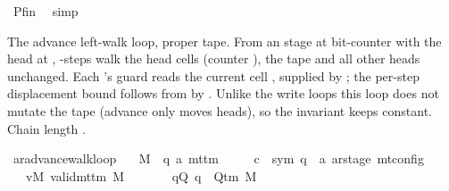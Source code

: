 \begin{isabellebody}
\ Pfin\ \isamarkupfalse%
\ simp\isanewline
\ \ \isamarkupfalse%
\isanewline
{}\isamarkupfalse%
%
\endisatagproof
{\isafoldproof}%
%
\isadelimproof
%
\endisadelimproof
%
\begin{isamarkuptext}%
The advance left-walk loop, proper tape.  From an
   stage at bit-counter  with the head
  at ,  -steps walk the head
   cells  (counter ), the tape
  and all other heads unchanged.  Each 's
   guard reads the current cell
  , supplied  by ;
  the per-step displacement bound  follows from
   by .  Unlike the write loops this loop
  does not mutate the tape (advance only moves heads), so the invariant
  keeps  constant.  Chain length
  .%
\end{isamarkuptext}\isamarkuptrue%
\isamarkupfalse%
\ ar{\isacharunderscore}{\kern0pt}advance{\isacharunderscore}{\kern0pt}walk{\isacharunderscore}{\kern0pt}loop{\isacharcolon}{\kern0pt}\isanewline
\ \ \ M\ {\isacharcolon}{\kern0pt}{\isacharcolon}{\kern0pt}\ {\isachardoublequoteopen}{\isacharparenleft}{\kern0pt}{\isacharprime}{\kern0pt}q{\isacharcomma}{\kern0pt}\ {\isacharprime}{\kern0pt}a{\isacharparenright}{\kern0pt}\ mttm{\isachardoublequoteclose}\isanewline
\ \ \ \ \ c{}\ {\isacharcolon}{\kern0pt}{\isacharcolon}{\kern0pt}\ {\isachardoublequoteopen}{\isacharparenleft}{\kern0pt}sym{}{\isacharcomma}{\kern0pt}\ {\isacharprime}{\kern0pt}q\ {\isasymtimes}\ {\isacharprime}{\kern0pt}a\ ar{\isacharunderscore}{\kern0pt}stage{\isacharparenright}{\kern0pt}\ mt{\isacharunderscore}{\kern0pt}config{\isachardoublequoteclose}\isanewline
\ \ \ vM{\isacharcolon}{\kern0pt}\ {\isachardoublequoteopen}valid{\isacharunderscore}{\kern0pt}mttm\ M{\isachardoublequoteclose}\isanewline
\ \ \ \ \ \ \ qQ{\isacharcolon}{\kern0pt}\ {\isachardoublequoteopen}q\ {\isasymin}\ Q{\isacharunderscore}{\kern0pt}tm\ M{\isachardoublequoteclose}\isanewline

\end{isabellebody}
